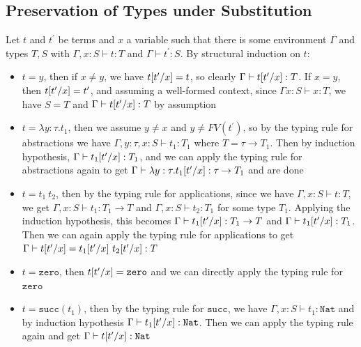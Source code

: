 \documentclass{article}
\newcommand{\subst}[3]{\ensuremath #1[#2/#3]}
\begin{document}
\subsection*{Preservation of Types under Substitution}
Let $t$ and $t^{\prime}$ be terms and $x$ a variable such that there is some environment $\Gamma$ and types $T,S$ 
with $\Gamma,x:S\vdash t:T$ and $\Gamma\vdash t^{\prime}:S$. 
By structural induction on $t$:
\begin{itemize}
\item $t=y$, then if $x\neq y$, we have $\subst{t}{t^{\prime}}{x} = t$, so clearly $\Gamma\vdash \subst{t}{t^{\prime}}{x}:T$. If $x=y$, then $\subst{t}{t^{\prime}}{x} = t^{\prime}$, and assuming a well-formed context, since $\Gamma x:S\vdash x:T$, we have $S=T$ and $\Gamma\vdash \subst{t}{t^{\prime}}{x}:T$ by assumption
\item $t=\lambda y:\tau.t_1$, then we assume $y\neq x$ and $y\neq FV(t^{\prime})$, so by the typing rule for abstractions we have $\Gamma,y:\tau,x:S\vdash t_1:T_1$ where $T = \tau \rightarrow T_1$.
Then by induction hypothesis, $\Gamma \vdash \subst{t_1}{t^{\prime}}{x}: T_1$, and we can apply the typing rule for abstractions again to get $\Gamma\vdash \lambda y:\tau. \subst{t_1}{t^{\prime}}{x}:\tau \rightarrow T_1$ and are done 
\item $t = t_1\ t_2$, then by the typing rule for applications, since we have $\Gamma,x:S\vdash t:T$, we get $\Gamma,x:S\vdash t_1: T_1 \rightarrow T$ and $\Gamma,x:S\vdash t_2:T_1$ for some type $T_1$. 
Applying the induction hypothesis, this becomes $\Gamma\vdash \subst{t_1}{t^{\prime}}{x}:T_1\rightarrow T$ and $\Gamma\vdash \subst{t_1}{t^{\prime}}{x}:T_1$.
Then we can again apply the typing rule for applications to get $\Gamma \vdash \subst{t}{t^{\prime}}{x} = \subst{t_1}{t^{\prime}}{x}\ \subst{t_2}{t^{\prime}}{x}: T$
\item $t=\mathtt{zero}$, then $\subst{t}{t^{\prime}}{x} = \mathtt{zero}$ and we can directly apply the typing rule for $\mathtt{zero}$
\item $t = \mathtt{succ}(t_1)$, then by the typing rule for $\mathtt{succ}$, we have $\Gamma,x:S\vdash t_1:\mathtt{Nat}$ and by induction hypothesis $\Gamma \vdash \subst{t_1}{t^{\prime}}{x}:\mathtt{Nat}$. 
Then we can apply the typing rule again and get $\Gamma\vdash \subst{t}{t^{\prime}}{x}:\mathtt{Nat}$
\end{itemize}
\end{document}
